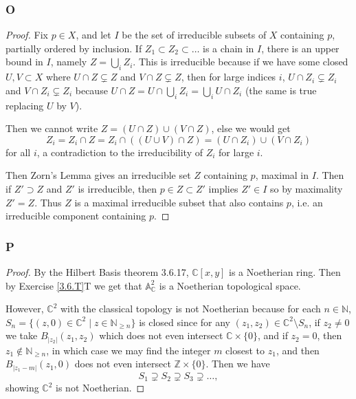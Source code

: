 \documentclass{article}
\newcommand{\A}{\mathbb{A}}
\newcommand{\N}{\mathbb{N}}
\newcommand{\Z}{\mathbb{Z}}
\newcommand{\C}{\mathbb{C}}
\theoremstyle{definition} %
\begin{document}
\subsubsection{O}\label{3.6.O}
\begin{proof}
    Fix $p\in X$, and let $I$ be the set of irreducible subsets of $X$ containing $p$, partially ordered by inclusion. If $Z_1\subset Z_2 \subset \dots$ is a chain in $I$, there is an upper bound in $I$, namely $Z=\bigcup_i Z_i$. This is irreducible because if we have some closed $U,V\subset X$ where $U\cap Z\subsetneq Z$ and $V\cap Z\subsetneq Z$, then for large indices $i$, $U\cap Z_i \subsetneq Z_i$ and $V\cap Z_i \subsetneq Z_i$ because $U\cap Z = U\cap \bigcup_i Z_i = \bigcup_i U\cap Z_i$ (the same is true replacing $U$ by $V$). 
    
    Then we cannot write $Z=(U\cap Z) \cup (V\cap Z)$, else we would get
    \[
    Z_i=Z_i \cap Z = Z_i \cap ((U\cup V)\cap Z)=(U\cap Z_i)\cup (V\cap Z_i)
    \]
    for all $i$, a contradiction to the irreducibility of $Z_i$ for large $i$.

    Then Zorn's Lemma gives an irreducible set $Z$ containing $p$, maximal in $I$. Then if $Z'\supset Z$ and $Z'$ is irreducible, then $p\in Z\subset Z'$ implies $Z'\in I$ so by maximality $Z'=Z$. Thus $Z$ is a maximal irreducible subset that also contains $p$, i.e. an irreducible component containing $p$.
\end{proof}
\subsubsection{P}\label{3.6.P}
\begin{proof}
    By the Hilbert Basis theorem 3.6.17, $\C[x,y]$ is a Noetherian ring. Then by Exercise \ref{3.6.T}T
    we get that $\A^2_\C$ is a Noetherian topological space.

    However, $\C^2$ with the classical topology is not Noetherian because for each $n\in \N$, $S_n=\{ (z,0)\in \C^2\mid z\in \N_{\ge n}\}$ is closed since for any $(z_1,z_2)\in \C^2\setminus S_n$, if $z_2\ne 0$ we take $B_{|z_2|}(z_1,z_2)$ which does not even intersect $\C\times \{0\}$, and if $z_2=0$, then $z_1\notin \N_{\ge n}$, in which case we may find the integer $m$ closest to $z_1$, and then $B_{|z_1-m|}(z_1,0)$ does not even intersect $\Z \times \{0\}$. Then we have $$S_1\supsetneq S_2\supsetneq S_3 \supsetneq \dots,$$showing $\C^2$ is not Noetherian.
\end{proof}
\end{document}
